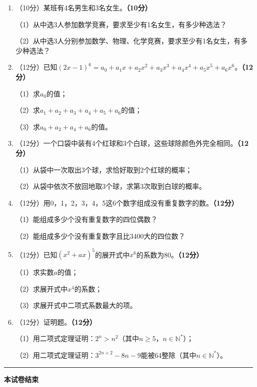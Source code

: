 \documentclass[12pt, a4paper]{ctexart}
\newcommand{\score}[1]{\hfill\textbf{（#1分）}}
\begin{document}
\begin{enumerate}[label=\textbf{\arabic*.}, leftmargin=2em, resume]

\item（10分）某班有4名男生和3名女生。\score{10}

（1）从中选3人参加数学竞赛，要求至少有1名女生，有多少种选法？

（2）从中选3人分别参加数学、物理、化学竞赛，要求至少有1名女生，有多少种选法？

\item（12分）已知$(2x-1)^6 = a_0 + a_1 x + a_2 x^2 + a_3 x^3 + a_4 x^4 + a_5 x^5 + a_6 x^6$。\score{12}

（1）求$a_0$的值；

（2）求$a_1 + a_2 + a_3 + a_4 + a_5 + a_6$的值；

（3）求$a_0 + a_2 + a_4 + a_6$的值。

\item（12分）一个口袋中装有4个红球和3个白球，这些球除颜色外完全相同。\score{12}

（1）从袋中一次取出3个球，求恰好取到2个红球的概率；

（2）从袋中依次不放回地取3个球，求第3次取到白球的概率。

\item（12分）用0，1，2，3，4，5这6个数字组成没有重复数字的数。\score{12}

（1）能组成多少个没有重复数字的四位偶数？

（2）能组成多少个没有重复数字且比3400大的四位数？

\item（12分）已知$(x^2+ax)^5$的展开式中$x^6$的系数为80。\score{12}

（1）求实数$a$的值；

（2）求展开式中$x^4$的系数；

（3）求展开式中二项式系数最大的项。

\item（12分）证明题。\score{12}

（1）用二项式定理证明：$2^n > n^2$（其中$n \geqslant 5$，$n \in \mathbb{N}^*$）；

（2）用二项式定理证明：$3^{2n+2} - 8n - 9$能被64整除（其中$n \in \mathbb{N}^*$）。

\end{enumerate}

\vspace{1cm}
\begin{center}
\rule{8cm}{0.4pt}

\vspace{0.3cm}
\textbf{本试卷结束}
\end{center}
\end{document}
